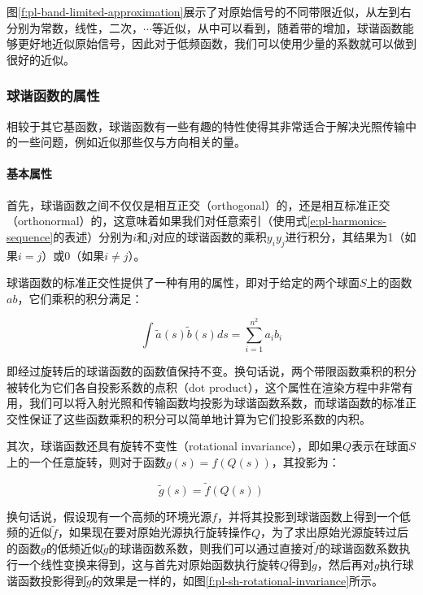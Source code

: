 图\ref{f:pl-band-limited-approximation}展示了对原始信号的不同带限近似，从左到右分别为常数，线性，二次，$\cdots$等近似，从中可以看到，随着带的增加，球谐函数能够更好地近似原始信号，因此对于低频函数，我们可以使用少量的系数就可以做到很好的近似。



\subsubsection{球谐函数的属性}
相较于其它基函数，球谐函数有一些有趣的特性使得其非常适合于解决光照传输中的一些问题，例如近似那些仅与方向相关的量。


\paragraph{基本属性}
首先，球谐函数之间不仅仅是相互正交（orthogonal）的，还是相互标准正交（orthonormal）的，这意味着如果我们对任意索引（使用式\ref{e:pl-harmonics-sequence}的表述）分别为$i$和$j$对应的球谐函数的乘积$y_iy_j$进行积分，其结果为1（如果$i=j$）或0（如果$i\neq j$）。

球谐函数的标准正交性提供了一种有用的属性，即对于给定的两个球面$S$上的函数$a$$b$，它们乘积的积分满足：

\begin{equation}\label{e:pl-dot-product}
	\int \tilde{a}(s)\tilde{b}(s)ds=\sum^{n^{2}}_{i=1}a_ib_i
\end{equation}

即经过旋转后的球谐函数的函数值保持不变。换句话说，两个带限函数乘积的积分被转化为它们各自投影系数的点积（dot product），这个属性在渲染方程中非常有用，我们可以将入射光照和传输函数均投影为球谐函数系数，而球谐函数的标准正交性保证了这些函数乘积的积分可以简单地计算为它们投影系数的内积。

其次，球谐函数还具有旋转不变性（rotational invariance），即如果$Q$表示在球面$S$上的一个任意旋转，则对于函数$g(s)=f(Q(s))$，其投影为：

\begin{equation}
	\tilde{g}(s)=\tilde{f}(Q(s))
\end{equation}

换句话说，假设现有一个高频的环境光源$f$，并将其投影到球谐函数上得到一个低频的近似$\tilde{f}$，如果现在要对原始光源执行旋转操作$Q$，为了求出原始光源旋转过后的函数$g$的低频近似$\tilde{g}$的球谐函数系数，则我们可以通过直接对$\tilde{f}$的球谐函数系数执行一个线性变换来得到，这与首先对原始函数执行旋转$Q$得到$g$，然后再对$g$执行球谐函数投影得到$\tilde{g}$的效果是一样的，如图\ref{f:pl-sh-rotational-invariance}所示。

